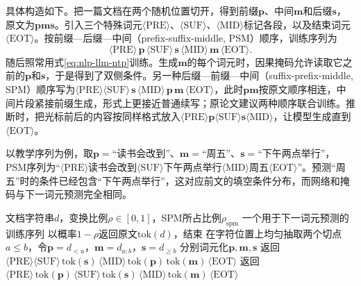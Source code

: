 具体构造如下。把一篇文档在两个随机位置切开，得到前缀$\bm p$、中间$\bm m$和后缀$\bm s$，原文为$\bm p\bm m\bm s$。引入三个特殊词元$\langle\mathrm{PRE}\rangle$、$\langle\mathrm{SUF}\rangle$、$\langle\mathrm{MID}\rangle$标记各段，以及结束词元$\langle\mathrm{EOT}\rangle$。按前缀—后缀—中间（prefix-suffix-middle, PSM）顺序，训练序列为
\[
 \langle\mathrm{PRE}\rangle\,\bm p\,\langle\mathrm{SUF}\rangle\,\bm s\,\langle\mathrm{MID}\rangle\,\bm m\,\langle\mathrm{EOT}\rangle .
\]
随后照常用式\eqref{eq:nlp-llm-ntp}训练。生成$\bm m$的每个词元时，因果掩码允许读取它之前的$\bm p$和$\bm s$，于是得到了双侧条件。另一种后缀—前缀—中间（suffix-prefix-middle, SPM）顺序写为$\langle\mathrm{PRE}\rangle\langle\mathrm{SUF}\rangle\,\bm s\,\langle\mathrm{MID}\rangle\,\bm p\,\bm m\,\langle\mathrm{EOT}\rangle$，此时$\bm p\bm m$按原文顺序相连，中间片段紧接前缀生成，形式上更接近普通续写；原论文建议两种顺序联合训练。推断时，把光标前后的内容按同样格式放入$\langle\mathrm{PRE}\rangle\bm p\langle\mathrm{SUF}\rangle\bm s\langle\mathrm{MID}\rangle$，让模型生成直到$\langle\mathrm{EOT}\rangle$。

以教学序列为例，取$\bm p=$“读书会改到”、$\bm m=$“周五”、$\bm s=$“下午两点举行”，PSM序列为“$\langle\mathrm{PRE}\rangle$读书会改到$\langle\mathrm{SUF}\rangle$下午两点举行$\langle\mathrm{MID}\rangle$周五$\langle\mathrm{EOT}\rangle$”。预测“周五”时的条件已经包含“下午两点举行”，这对应前文的填空条件分布，而网络和掩码与下一词元预测完全相同。

\begin{algorithm}[中间填充的样本构造]
  \label{alg:nlp-llm-fim}
  \begin{algorithmic}[1]
    \Require 文档字符串$d$，变换比例$\rho\in[0,1]$，SPM所占比例$\rho_{\mathrm{spm}}$
    \Ensure 一个用于下一词元预测的训练序列
    \State 以概率$1-\rho$返回原文$\mathrm{tok}(d)$，结束
    \State 在字符位置上均匀抽取两个切点$a\leq b$，令$\bm p=d_{<a}$，$\bm m=d_{a:b}$，$\bm s=d_{\geq b}$
    \State 分别词元化$\bm p,\bm m,\bm s$
      \State 返回$\langle\mathrm{PRE}\rangle\langle\mathrm{SUF}\rangle\,\mathrm{tok}(\bm s)\,\langle\mathrm{MID}\rangle\,\mathrm{tok}(\bm p)\,\mathrm{tok}(\bm m)\,\langle\mathrm{EOT}\rangle$
    \Else
      \State 返回$\langle\mathrm{PRE}\rangle\,\mathrm{tok}(\bm p)\,\langle\mathrm{SUF}\rangle\,\mathrm{tok}(\bm s)\,\langle\mathrm{MID}\rangle\,\mathrm{tok}(\bm m)\,\langle\mathrm{EOT}\rangle$
    \EndIf
  \end{algorithmic}
\end{algorithm}

